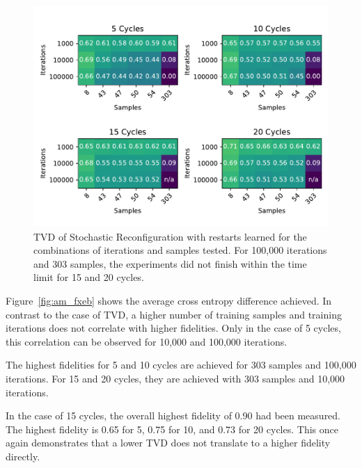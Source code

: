 \begin{figure}[H]
  \centering
  \includegraphics[width=\textwidth]{figures/results/AM-restarts-learned/tvd_heatmap.pdf}
  \caption[TVD of RBMs Trained with AdaMax with Random Restarts and $CZ$ Gates Learned]{TVD of Stochastic 
  Reconfiguration with restarts learned for the combinations of iterations and samples tested.
  For 100,000 iterations and 303 samples, the experiments did not finish within the time limit for 15 and 20 cycles.}
  \label{fig:am_tvd}
\end{figure}

Figure~\ref{fig:am_fxeb} shows the average cross entropy difference achieved. In contrast to the case 
of TVD, a higher number of training samples and training iterations does not correlate with higher 
fidelities. Only in the case of 5 cycles, this correlation can be observed for 10,000 and 100,000 iterations.

The highest fidelities for 5 and 10 cycles are achieved for 303 samples and 100,000 iterations. For 
15 and 20 cycles, they are achieved with 303 samples and 10,000 iterations. 

In the case of 15 cycles, the overall highest fidelity of 0.90 had been measured. The highest fidelity is 0.65 for 5, 0.75 for 10, and 0.73 for 20 cycles.
This once again demonstrates that a lower TVD does not translate to a higher fidelity directly.

